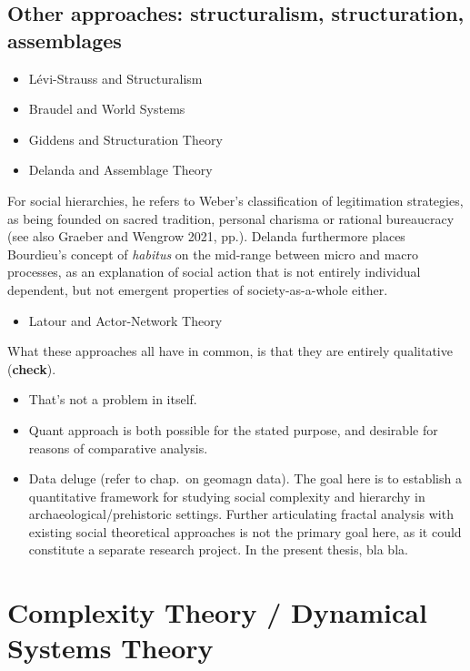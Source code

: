 \documentclass[
  12pt,
  a4paper, twoside]{book}
\providecommand{\tightlist}{%
  \setlength{\itemsep}{0pt}\setlength{\parskip}{0pt}}
\begin{document}
\hypertarget{other-approaches-structuralism-structuration-assemblages}{%
\subsection{Other approaches: structuralism, structuration, assemblages}\label{other-approaches-structuralism-structuration-assemblages}}

\begin{itemize}
\item
  Lévi-Strauss and Structuralism
\item
  Braudel and World Systems
\item
  Giddens and Structuration Theory
\item
  Delanda and Assemblage Theory
\end{itemize}

For social hierarchies, he refers to Weber's classification of legitimation strategies, as being founded on sacred tradition, personal charisma or rational bureaucracy (see also Graeber and Wengrow 2021, pp.). Delanda furthermore places Bourdieu's concept of \emph{habitus} on the mid-range between micro and macro processes, as an explanation of social action that is not entirely individual dependent, but not emergent properties of society-as-a-whole either.

\begin{itemize}
\tightlist
\item
  Latour and Actor-Network Theory
\end{itemize}

What these approaches all have in common, is that they are entirely qualitative (\textbf{check}).

\begin{itemize}
\item
  That's not a problem in itself.
\item
  Quant approach is both possible for the stated purpose, and desirable for reasons of comparative analysis.
\item
  Data deluge (refer to chap.~on geomagn data). The goal here is to establish a quantitative framework for studying social complexity and hierarchy in archaeological/prehistoric settings. Further articulating fractal analysis with existing social theoretical approaches is not the primary goal here, as it could constitute a separate research project. In the present thesis, bla bla.
\end{itemize}

\hypertarget{complexity-theory-dynamical-systems-theory}{%
\section{Complexity Theory / Dynamical Systems Theory}\label{complexity-theory-dynamical-systems-theory}}
\end{document}
